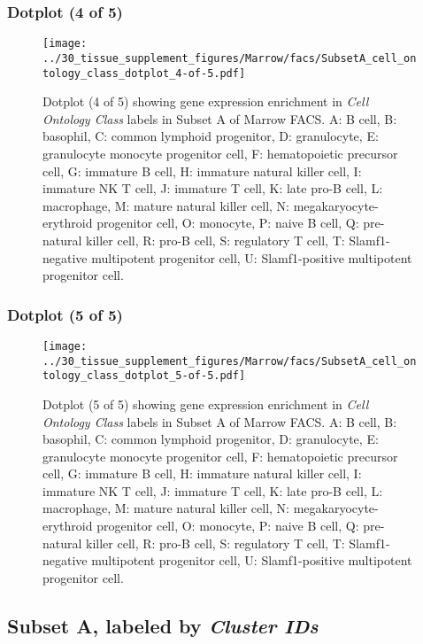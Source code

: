 \subsubsection{Dotplot (4 of 5)}
\begin{figure}[h]
\centering
\texttt{[image: ../30\_tissue\_supplement\_figures/Marrow/facs/SubsetA\_cell\_ontology\_class\_dotplot\_4-of-5.pdf]}

\caption{ Dotplot (4 of 5)  showing gene expression enrichment in \emph{Cell Ontology Class} labels in Subset A of Marrow FACS. A: B cell, B: basophil, C: common lymphoid progenitor, D: granulocyte, E: granulocyte monocyte progenitor cell, F: hematopoietic precursor cell, G: immature B cell, H: immature natural killer cell, I: immature NK T cell, J: immature T cell, K: late pro-B cell, L: macrophage, M: mature natural killer cell, N: megakaryocyte-erythroid progenitor cell, O: monocyte, P: naive B cell, Q: pre-natural killer cell, R: pro-B cell, S: regulatory T cell, T: Slamf1-negative multipotent progenitor cell, U: Slamf1-positive multipotent progenitor cell.}
\end{figure}


\clearpage

\subsubsection{Dotplot (5 of 5)}
\begin{figure}[h]
\centering
\texttt{[image: ../30\_tissue\_supplement\_figures/Marrow/facs/SubsetA\_cell\_ontology\_class\_dotplot\_5-of-5.pdf]}

\caption{ Dotplot (5 of 5)  showing gene expression enrichment in \emph{Cell Ontology Class} labels in Subset A of Marrow FACS. A: B cell, B: basophil, C: common lymphoid progenitor, D: granulocyte, E: granulocyte monocyte progenitor cell, F: hematopoietic precursor cell, G: immature B cell, H: immature natural killer cell, I: immature NK T cell, J: immature T cell, K: late pro-B cell, L: macrophage, M: mature natural killer cell, N: megakaryocyte-erythroid progenitor cell, O: monocyte, P: naive B cell, Q: pre-natural killer cell, R: pro-B cell, S: regulatory T cell, T: Slamf1-negative multipotent progenitor cell, U: Slamf1-positive multipotent progenitor cell.}
\end{figure}


\clearpage

\subsection{Subset A, labeled by \emph{Cluster IDs}}
